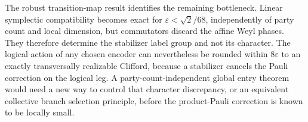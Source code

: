 The robust transition-map result identifies the remaining bottleneck.
Linear symplectic compatibility becomes exact for
\(\varepsilon<\sqrt2/68\), independently of party count and local dimension, but commutators discard the affine Weyl phases.  They
therefore determine the stabilizer label group and not its character.  The
logical action of any chosen encoder can nevertheless be rounded within
\(8\varepsilon\) to an exactly transversally realizable Clifford, because a
stabilizer cancels the Pauli correction on the logical leg.  A
party-count-independent global entry theorem would need a new way to
control that character discrepancy, or an equivalent collective branch
selection principle, before the product-Pauli correction is known to be
locally small.
